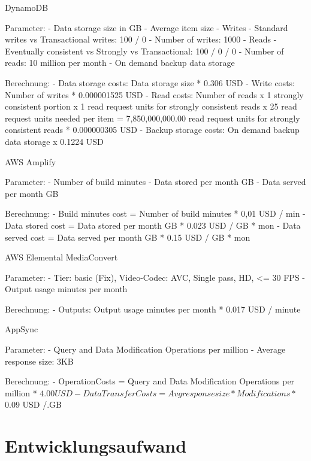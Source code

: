   DynamoDB

  Parameter:
  - Data storage size in GB
  - Average item size
  - Writes
      - Standard writes vs Transactional writes: 100 / 0
      - Number of writes: 1000
  - Reads
      - Eventually consistent vs Strongly vs Transactional: 100 / 0 / 0
      - Number of reads: 10 million per month
  - On demand backup data storage

  Berechnung:
  - Data storage costs: Data storage size * 0.306 USD
  - Write costs: Number of writes * 0.000001525 USD
  - Read costs: Number of reads x 1 strongly consistent portion x 1 read request units for strongly consistent reads x 25 read request units needed per item = 7,850,000,000.00 read request units for strongly consistent reads * 0.000000305 USD
  - Backup storage costs: On demand backup data storage x 0.1224 USD

  AWS Amplify

  Parameter:
  - Number of build minutes
  - Data stored per month GB
  - Data served per month GB

  Berechnung:
  - Build minutes cost = Number of build minutes * 0,01 USD / min
  - Data stored cost = Data stored per month GB * 0.023 USD / GB * mon
  - Data served cost = Data served per month GB * 0.15 USD / GB * mon

  AWS Elemental MediaConvert

  Parameter:
  - Tier: basic (Fix), Video-Codec: AVC, Single pass, HD, <= 30 FPS
  - Output usage minutes per month

  Berechnung:
  - Outputs: Output usage minutes per month * 0.017 USD / minute

  AppSync

  Parameter:
  - Query and Data Modification Operations per million
  - Average response size: 3KB

  Berechnung:
  - OperationCosts = Query and Data Modification Operations per million * $4.00 USD
  - Data Transfer Costs = Avg response size * Modifications * $0.09 USD /.GB

















\section{Entwicklungsaufwand}

